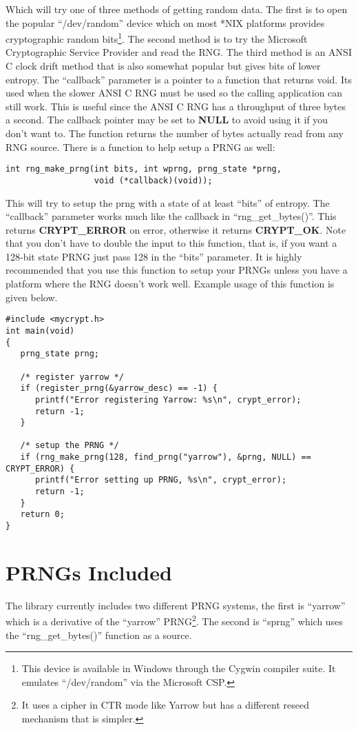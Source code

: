 \documentclass{book}
\begin{document}
Which will try one of three methods of getting random data.  The first is to open the popular ``/dev/random'' device which 
on most *NIX platforms provides cryptographic random bits\footnote{This device is available in Windows through the Cygwin compiler suite.  It emulates ``/dev/random'' via the Microsoft CSP.}.  
The second method is to try the Microsoft Cryptographic Service Provider and read the RNG.  The third method is an ANSI C 
clock drift method that is also somewhat popular but gives bits of lower entropy.  The ``callback'' parameter is a pointer to a function that returns void.  Its used when the slower ANSI C RNG must be 
used so the calling application can still work.  This is useful since the ANSI C RNG has a throughput of three 
bytes a second.  The callback pointer may be set to {\bf NULL} to avoid using it if you don't want to.  The function 
returns the number of bytes actually read from any RNG source.  There is a function to help setup a PRNG as well:
\begin{verbatim}
int rng_make_prng(int bits, int wprng, prng_state *prng, 
                  void (*callback)(void));
\end{verbatim}
This will try to setup the prng with a state of at least ``bits'' of entropy.  The ``callback'' parameter works much like
the callback in ``rng\_get\_bytes()''.  This returns {\bf CRYPT\_ERROR} on error, otherwise it returns {\bf CRYPT\_OK}.  
Note that you don't have to double the  input to this function, that is, if you want a 128-bit state PRNG just pass 128
in the ``bits'' parameter.  It is highly recommended that you use this function to setup your PRNGs unless you have a
platform where the RNG doesn't work well.  Example usage of this function is given below.

\begin{verbatim}
#include <mycrypt.h>
int main(void)
{
   prng_state prng;

   /* register yarrow */
   if (register_prng(&yarrow_desc) == -1) {
      printf("Error registering Yarrow: %s\n", crypt_error);
      return -1;
   }

   /* setup the PRNG */
   if (rng_make_prng(128, find_prng("yarrow"), &prng, NULL) == CRYPT_ERROR) {
      printf("Error setting up PRNG, %s\n", crypt_error);
      return -1;
   }
   return 0;
}
\end{verbatim}

\section{PRNGs Included}
The library currently includes two different PRNG systems, the first is ``yarrow'' which is a derivative of the ``yarrow''
PRNG\footnote{It uses a cipher in CTR mode like Yarrow but has a different reseed mechanism that is simpler.}.  The second 
is ``sprng'' which uses the ``rng\_get\_bytes()'' function as a source.
\end{document}
